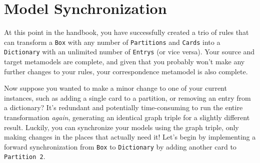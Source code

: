 \newpage
\section{Model Synchronization}
\genHeader

At this point in the handbook, you have successfully created a trio of rules that can transform a \texttt{Box} with any number of \texttt{Partitions} and
\texttt{Cards} into a \texttt{Dictionary} with an unlimited number of \texttt{Entrys} (or vice versa). Your source and target metamodels are complete, and given
that you probably won't make any further changes to your rules, your correspondence metamodel is also complete.

Now suppose you wanted to make a minor change to one of your current instances, such as adding a single card to a partition, or removing an entry from a
dictionary? It's redundant and potentially time-consuming to run the entire transformation \emph{again}, generating an identical graph triple for a slightly
different result. Luckily, you can synchronize your models using the graph triple, only making changes in the places that actually need it! Let's begin by
implementing a forward synchronization from \texttt{Box} to \texttt{Dictionary} by adding another card to \texttt{Partition 2}.

